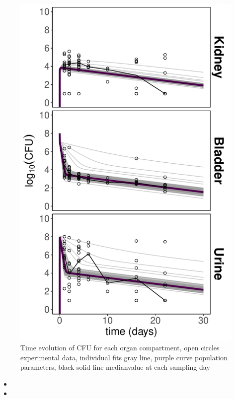 \documentclass{article}
\begin{document}
\begin{figure}
	\centering
	\includegraphics[width=\linewidth]{images/plt_final_model_Ct_PAS_vertical.pdf}
	\caption{Time evolution of CFU for each organ compartment, open circles experimental data, individual fits gray line, purple curve population parameters, black solid line medianvalue at each sampling day}
	\label{fig:ModelIndFits}
\end{figure}


\begin{itemize}
	\item {}
	\item {}
\end{itemize}
\end{document}
